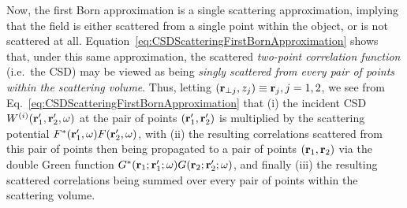 \documentclass[%
 reprint,
 amsmath,amssymb,
 aps,
]{revtex4-1}
\begin{document}
Now, the first Born approximation is a single scattering approximation, implying that the field is either scattered from a single point within the object, or is not scattered at all.  Equation~\ref{eq:CSDScatteringFirstBornApproximation} shows that, under this same approximation, the scattered {\em two-point correlation function} (i.e.~the CSD) may be viewed as being {\em singly scattered from every pair of points within the scattering volume}.  Thus, letting $({\bf r}_{\perp j},z_j)\equiv{\bf r}_j, j=1,2$, we see from Eq.~\ref{eq:CSDScatteringFirstBornApproximation} that (i) the incident CSD $W^{(i)}({\bf r}'_1,{\bf r}'_2,\omega)$ at the pair of points $({\bf r}'_1,{\bf r}'_2)$ is multiplied by the scattering potential $F^*({\bf r}'_1,\omega)F({\bf r}'_2,\omega)$, with (ii) the resulting correlations scattered from this pair of points then being propagated to a pair of points $({\bf r}_1,{\bf r}_2)$ via the double Green function $G^*({\bf r}_1;{\bf r}'_1;\omega)G({\bf r}_2;{\bf r}'_2;\omega)$, and finally (iii) the resulting scattered correlations being summed over every pair of points within the scattering volume. 
\end{document}
